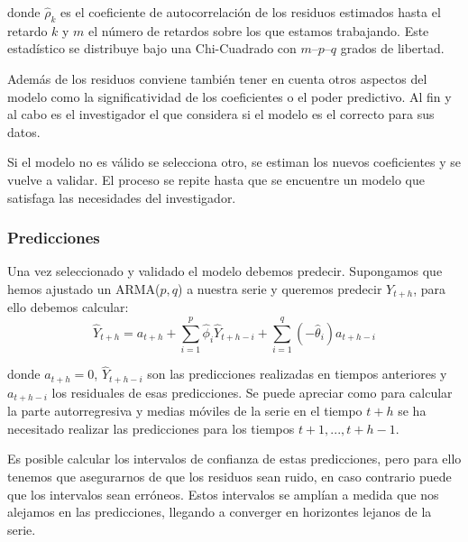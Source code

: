 \noindent donde $\hat{\rho}_{k}$ es el coeficiente de autocorrelación de los residuos estimados hasta el retardo $k$ y $m$ el número de retardos sobre los que estamos trabajando. Este estadístico se distribuye bajo una Chi-Cuadrado con $m – p – q$ grados de libertad.

Además de los residuos conviene también tener en cuenta otros aspectos del modelo como la significatividad de los coeficientes o el poder predictivo. Al fin y al cabo es el investigador el que considera si el modelo es el correcto para sus datos.
	
Si el modelo no es válido se selecciona otro, se estiman los nuevos coeficientes y se vuelve a validar. El proceso se repite hasta que se encuentre un modelo que satisfaga las necesidades del investigador.

\subsubsection{Predicciones}
Una vez seleccionado y validado el modelo debemos predecir. Supongamos que hemos ajustado un ARMA($p, q$) a nuestra serie y queremos predecir $Y_{t + h}$, para ello debemos calcular:
\begin{equation}
    \widehat{Y}_{t + h} = a_{t + h} + \sum_{i=1}^{p} \widehat{\phi}_{i} \widehat{Y}_{t+h-i} + \sum_{i=1}^{q} (-\widehat{\theta}_{i}) a_{t+h-i}
\end{equation}

\noindent donde $a_{t + h} = 0$, $\widehat{Y}_{t+h-i}$ son las predicciones realizadas en tiempos anteriores y $a_{t+h-i}$ los residuales de esas predicciones. Se puede apreciar como para calcular la parte autorregresiva y medias móviles de la serie en el tiempo $t + h$ se ha necesitado realizar las predicciones para los tiempos $t+1,...,t+h-1$.

Es posible calcular los intervalos de confianza de estas predicciones, pero para ello tenemos que asegurarnos de que los residuos sean ruido, en caso contrario puede que los intervalos sean erróneos. Estos intervalos se amplían a medida que nos alejamos en las predicciones, llegando a converger en horizontes lejanos de la serie.
